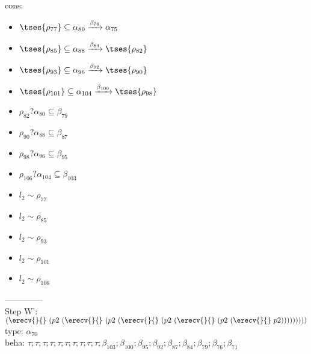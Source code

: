 \documentclass[12pt]{article}
\begin{document}
\\  cons: \begin{itemize}
\item $  \tses{ \rho_{77}} \subseteq \alpha_{80} \xrightarrow{\beta_{76}} \alpha_{75} $
\item $  \tses{ \rho_{85}} \subseteq \alpha_{88} \xrightarrow{\beta_{84}}  \tses{ \rho_{82}} $
\item $  \tses{ \rho_{93}} \subseteq \alpha_{96} \xrightarrow{\beta_{92}}  \tses{ \rho_{90}} $
\item $  \tses{ \rho_{101}} \subseteq \alpha_{104} \xrightarrow{\beta_{100}}  \tses{ \rho_{98}} $
\item $ \rho_{82}?\alpha_{80} \subseteq \beta_{79} $
\item $ \rho_{90}?\alpha_{88} \subseteq \beta_{87} $
\item $ \rho_{98}?\alpha_{96} \subseteq \beta_{95} $
\item $ \rho_{106}?\alpha_{104} \subseteq \beta_{103} $
\item $ l_{2} \sim\rho_{77} $
\item $ l_{2} \sim\rho_{85} $
\item $ l_{2} \sim\rho_{93} $
\item $ l_{2} \sim\rho_{101} $
\item $ l_{2} \sim\rho_{106} $
\end{itemize} 
  --------------\\ 
Step W': $ (\erecv{}{}~(p2~(\erecv{}{}~(p2~(\erecv{}{}~(p2~(\erecv{}{}~(p2~(\erecv{}{}~p2))))))))) $\\
  type: $ \alpha_{70} $ 
\\  beha: $ \tau; \tau; \tau; \tau; \tau; \tau; \tau; \tau; \tau; \tau; \beta_{103}; \beta_{100}; \beta_{95}; \beta_{92}; \beta_{87}; \beta_{84}; \beta_{79}; \beta_{76}; \beta_{71} $ 
\end{document}
